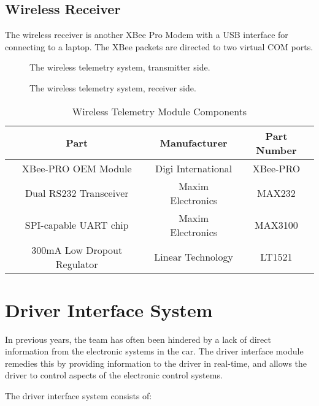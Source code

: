 \subsection{Wireless Receiver}

The wireless receiver is another XBee Pro Modem with a USB interface for connecting to a laptop. The XBee packets are directed to two virtual COM ports.

  \begin{figure}[H]
    \centering
      
    \caption{The wireless telemetry system, transmitter side.\label{fig:tele_tx_overview}}
  \end{figure}

  \begin{figure}[H]
    \centering
      
    \caption{The wireless telemetry system, receiver side.\label{fig:tele_rx_overview}}
  \end{figure}

  \begin{table}[H]
    \caption{Wireless Telemetry Module Components\label{tab:Wireless-Telemetry-Module}}
    \centering
      \begin{tabular}{|c|c|c|}
	\hline 
	Part & Manufacturer & Part Number\tabularnewline
	\hline
	\hline
	XBee-PRO OEM Module & Digi International & XBee-PRO\tabularnewline
	\hline 
	Dual RS232 Transceiver & Maxim Electronics & MAX232\tabularnewline
	\hline 
	SPI-capable UART chip & Maxim Electronics & MAX3100\tabularnewline
	\hline 
	300mA Low Dropout Regulator & Linear Technology & LT1521\tabularnewline
	\hline
      \end{tabular}
  \end{table}

%
%

\section{Driver Interface System}
\label{sec:driver_interface_system}


In previous years, the team has often been hindered by a lack of direct information from the electronic systems in the car. The driver interface module remedies this by providing information to the driver in real-time, and allows the driver to control aspects of the electronic control systems.

The driver interface system consists of:


